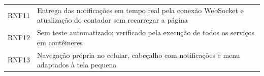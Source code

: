 \begin{apendicesenv}
\begin{SingleSpace}
\begin{longtable}{@{}>{\raggedright\arraybackslash}p{1.9cm}>{\raggedright\arraybackslash}p{12.6cm}@{}}
	RNF11 & Entrega das notificações em tempo real pela conexão WebSocket e atualização do contador sem recarregar a página \\
	RNF12 & Sem teste automatizado; verificado pela execução de todos os serviços em contêineres \\
	RNF13 & Navegação própria no celular, cabeçalho com notificações e menu adaptados à tela pequena \\
\end{longtable}
\end{SingleSpace}

\end{apendicesenv}
